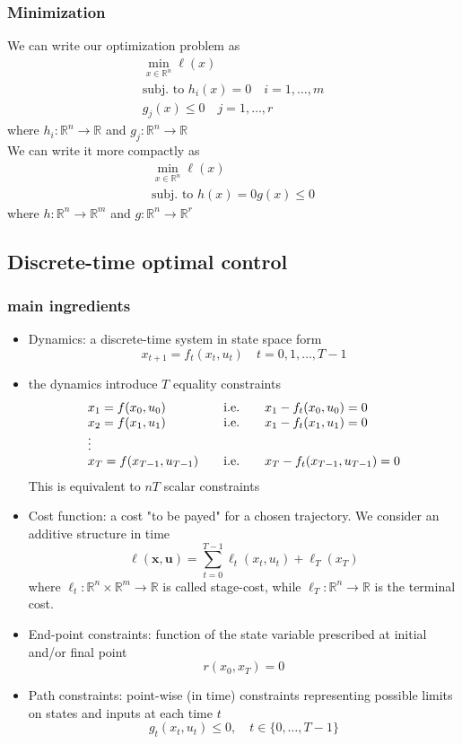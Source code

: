 \documentclass{book}
\newcommand{\R}{\mathbb{R}}
\theoremstyle{definition}
\theoremstyle{remark}
\theoremstyle{remark}
\begin{document}
\subsubsection{Minimization}
We can write our optimization problem as 
\begin{gather}
    \min_{x\in\R^n} \ell(x)\\
    \text{subj. to } h_i(x) = 0 \quad i=1,\dots,m\\
    g_j(x)\leq 0 \quad j=1,\dots,r
\end{gather}
where $h_i:\R^n\to\R$ and $g_j:\R^n\to\R$\\
We can write it more compactly as 
\begin{gather*}
    \min_{x\in\R^n} \ell(x)\\
    \text{subj. to } h(x) = 0 
    g(x)\leq 0 
\end{gather*}
where $h:\R^n\to\R^m$ and $g:\R^n\to\R^r$
\subsection{Discrete-time optimal control}
\subsubsection{main ingredients}
\begin{itemize}
    \item Dynamics: a discrete-time system in state space form 
        \[
            x_{t+1} = f_t(x_t,u_t) \quad t=0,1,\dots,T-1
        \]
    \item the dynamics introduce $T$ equality constraints 
        \[
            \begin{array}{l l l}
                x_1 = f(x_0,u_0) & \quad \text{i.e.} \quad& x_1-f_t(x_0,u_0)=0 \\
                x_2 = f(x_1,u_1) & \quad \text{i.e.} \quad & x_1-f_t(x_1,u_1)=0 \\
                \vdots \\
                x_T = f(x_{T-1},u_{T-1}) & \quad \text{i.e.} \quad & x_T-f_t(x_{T-1},u_{T-1})=0 \\
            \end{array}
        \] 
        This is equivalent to $nT$ scalar constraints
    \item Cost function: a cost "to be payed" for a chosen trajectory. We consider an additive structure in time 
        \[
            \ell(\mathbf{x},\mathbf{u}) = \displaystyle\sum_{t=0}^{T-1}\ell_t(x_t,u_t)+\ell_T(x_T)
        \]
        where $\ell_t:\R^n\times\R^m\to\R$ is called stage-cost, while $\ell_T:\R^n\to\R$ is the terminal cost. 
    \item End-point constraints: function of the state variable prescribed at initial and/or final point 
        \[
            r(x_0,x_T)=0
        \]
    \item Path constraints: point-wise (in time) constraints representing possible limits on states and inputs at each time $t$ 
        \[
            g_t(x_t,u_t)\leq 0, \quad t\in\{0,\dots,T-1\}
        \]
\end{itemize}
\end{document}

